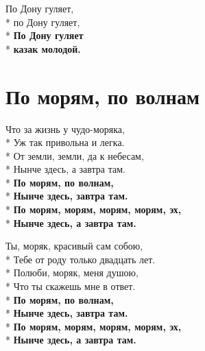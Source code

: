 \medskip

\begin{minipage}{\linewidth}
По Дону гуляет,\\*
по Дону гуляет,\\*
\textbf{По Дону гуляет}\\*
\textbf{казак молодой.}\\
\end{minipage}

\vspace{\fill}\newpage

\section{По морям, по волнам}
\label{song:По_морям,_по_волнам}

\medskip

\begin{minipage}{\linewidth}
Что за жизнь у чудо-моряка,\\*
Уж так привольна и легка.\\*
От земли, земли, да к небесам,\\*
Нынче здесь, а завтра там.\\*
\hspace*{1.5em}\textbf{По морям, по волнам,}\\*
\hspace*{1.5em}\textbf{Нынче здесь, завтра там.}\\*
\hspace*{1.5em}\textbf{По морям, морям, морям, морям, эх,}\\*
\hspace*{1.5em}\textbf{Нынче здесь, а завтра там.}\\
\end{minipage}\par\medskip\nobreak

\medskip

\begin{minipage}{\linewidth}
Ты, моряк, красивый сам собою,\\*
Тебе от роду только двадцать лет.\\*
Полюби, моряк, меня душою,\\*
Что ты скажешь мне в ответ.\\*
\hspace*{1.5em}\textbf{По морям, по волнам,}\\*
\hspace*{1.5em}\textbf{Нынче здесь, завтра там.}\\*
\hspace*{1.5em}\textbf{По морям, морям, морям, морям, эх,}\\*
\hspace*{1.5em}\textbf{Нынче здесь, а завтра там.}\\
\end{minipage}\par\medskip\nobreak

